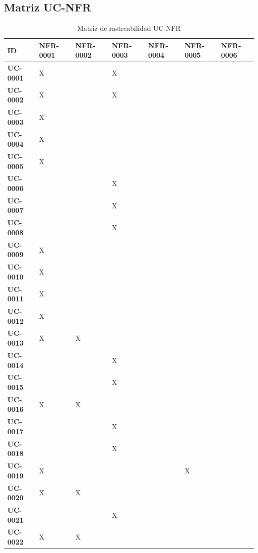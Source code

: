 \documentclass[11pt, a4paper]{article}
\begin{document}
\subsection{Matriz UC-NFR}

\begin{center}
{\small
\begin{longtable}{|p{2.2cm}|p{2.0cm}|p{2.0cm}|p{2.0cm}|p{2.0cm}|p{2.0cm}|p{2.0cm}|}
\caption{Matriz de rastreabilidad UC-NFR} \label{tab:matriz-uc-nfr} \\
\hline
\textbf{ID} & \textbf{NFR-0001} & \textbf{NFR-0002} & \textbf{NFR-0003} & \textbf{NFR-0004} & \textbf{NFR-0005} & \textbf{NFR-0006} \\
\hline
\hline
\endhead
\textbf{UC-0001} & X &  & X &  &  &  \\
\hline
\textbf{UC-0002} & X &  & X &  &  &  \\
\hline
\textbf{UC-0003} & X &  &  &  &  &  \\
\hline
\textbf{UC-0004} & X &  &  &  &  &  \\
\hline
\textbf{UC-0005} & X &  &  &  &  &  \\
\hline
\textbf{UC-0006} &  &  & X &  &  &  \\
\hline
\textbf{UC-0007} &  &  & X &  &  &  \\
\hline
\textbf{UC-0008} &  &  & X &  &  &  \\
\hline
\textbf{UC-0009} & X &  &  &  &  &  \\
\hline
\textbf{UC-0010} & X &  &  &  &  &  \\
\hline
\textbf{UC-0011} & X &  &  &  &  &  \\
\hline
\textbf{UC-0012} & X &  &  &  &  &  \\
\hline
\textbf{UC-0013} & X & X &  &  &  &  \\
\hline
\textbf{UC-0014} &  &  & X &  &  &  \\
\hline
\textbf{UC-0015} &  &  & X &  &  &  \\
\hline
\textbf{UC-0016} & X & X &  &  &  &  \\
\hline
\textbf{UC-0017} &  &  & X &  &  &  \\
\hline
\textbf{UC-0018} &  &  & X &  &  &  \\
\hline
\textbf{UC-0019} & X &  &  &  & X &  \\
\hline
\textbf{UC-0020} & X & X &  &  &  &  \\
\hline
\textbf{UC-0021} &  &  & X &  &  &  \\
\hline
\textbf{UC-0022} & X & X &  &  &  &  \\

\end{longtable}}
\end{center}
\end{document}
